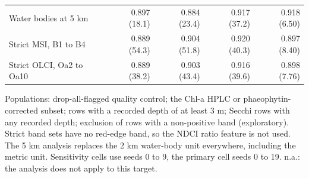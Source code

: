 \begin{table}[!tp]
\begin{tabular}{@{}lrrrr@{}}
\quad Water bodies at 5 km & 0.897 (18.1) & 0.884 (23.4) & 0.917 (37.2) & 0.918 (6.50) \\
\quad Strict MSI, B1 to B4 & 0.889 (54.3) & 0.904 (51.8) & 0.920 (40.3) & 0.897 (8.40) \\
\quad Strict OLCI, Oa2 to Oa10 & 0.889 (38.2) & 0.903 (43.4) & 0.916 (39.6) & 0.898 (7.76) \\
\bottomrule
\end{tabular}
\par\smallskip\raggedright\footnotesize Populations: drop-all-flagged quality control; the Chl-a HPLC or phaeophytin-corrected subset; rows with a recorded depth of at least 3 m; Secchi rows with any recorded depth; exclusion of rows with a non-positive band (exploratory). Strict band sets have no red-edge band, so the NDCI ratio feature is not used. The 5 km analysis replaces the 2 km water-body unit everywhere, including the metric unit. Sensitivity cells use seeds 0 to 9, the primary cell seeds 0 to 19. n.a.: the analysis does not apply to this target. 
\end{table}
